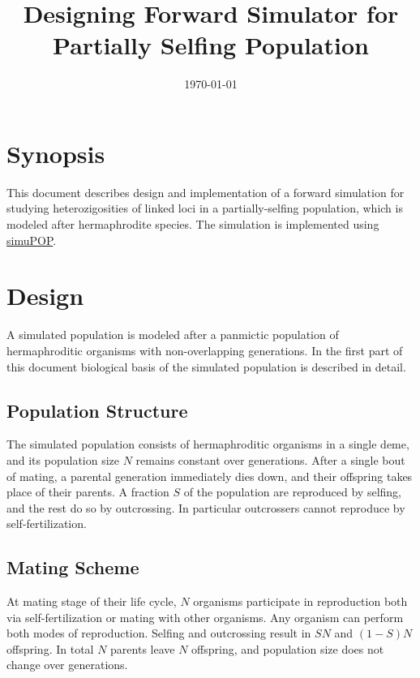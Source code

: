 \documentclass[12pt]{article}
\begin{document}
\title{Designing Forward Simulator for Partially Selfing Population}
\date{\today}
\maketitle

\section{Synopsis}
\label{sec:synopsis}

This document describes design and implementation of a forward
simulation for studying heterozigosities of linked loci in a
partially-selfing population, which is modeled after hermaphrodite
species.
The simulation is implemented using
\href{http://simupop.sourceforge.net/}{simuPOP}.

\section{Design}
\label{sec:design}

A simulated population is modeled after a panmictic population of
hermaphroditic organisms with non-overlapping generations.
In the first part of this document
biological basis of the simulated population is described in detail.

\subsection{Population Structure}
\label{sec:population-structure}

The simulated population consists of hermaphroditic organisms
in a single deme, and its population size \(N\) remains constant
over generations.
After a single bout of mating, a parental generation immediately dies
down, and their offspring takes place of their parents.
A fraction \(S\) of the population are reproduced by selfing,
and the rest do so by outcrossing.
In particular outcrossers cannot reproduce by self-fertilization.

\subsection{Mating Scheme}
\label{sec:mating-scheme}

At mating stage of their life cycle,
\(N\) organisms participate in reproduction both via
self-fertilization or mating with other organisms.
Any organism can perform both modes of reproduction.
Selfing and outcrossing result in \(SN\) and \((1-S)N\) offspring.
In total \(N\) parents leave \(N\) offspring, and population size does
not change over generations.
\end{document}
